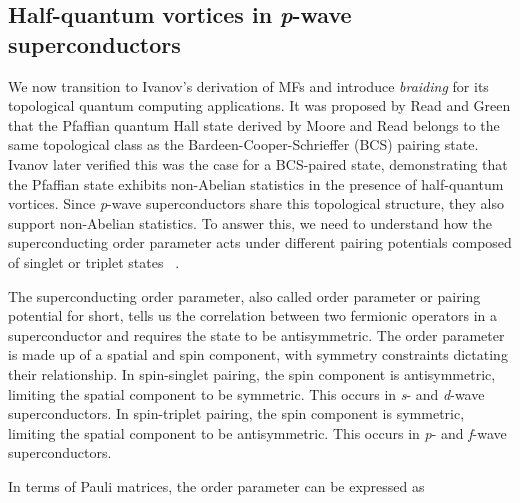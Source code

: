 \subsection{Half-quantum vortices in \textit{p}-wave superconductors}
We now transition to Ivanov's derivation of MFs and introduce \textit{braiding} for its topological quantum computing applications.
It was proposed by Read and Green that the Pfaffian quantum Hall state derived by Moore and Read belongs to the same topological class as the Bardeen-Cooper-Schrieffer (BCS) pairing state.
Ivanov later verified this was the case for a BCS-paired state, demonstrating that the Pfaffian state exhibits non-Abelian statistics in the presence of half-quantum vortices.
Since \textit{p}-wave superconductors share this topological structure, they also support non-Abelian statistics.
To answer this, we need to understand how the superconducting order parameter acts under different pairing potentials composed of singlet or triplet states ~\cite{ivanovNonAbelianStatisticsHalfQuantum2001}.

The superconducting order parameter, also called order parameter or pairing potential for short, tells us the correlation between two fermionic operators in a superconductor and requires the state to be antisymmetric.
The order parameter is made up of a spatial and spin component, with symmetry constraints dictating their relationship.
In spin-singlet pairing, the spin component is antisymmetric, limiting the spatial component to be symmetric.
This occurs in \textit{s}- and \textit{d}-wave superconductors.
In spin-triplet pairing, the spin component is symmetric, limiting the spatial component to be antisymmetric.
This occurs in \textit{p}- and \textit{f}-wave superconductors.

In terms of Pauli matrices, the order parameter can be expressed as


